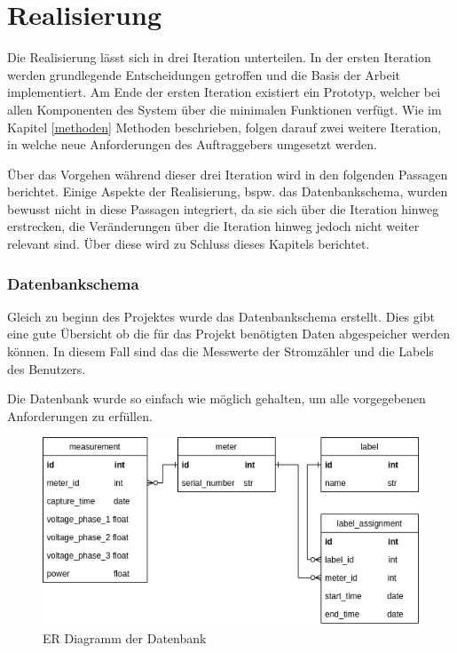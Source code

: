 \chapter{Realisierung}


Die Realisierung lässt sich in drei Iteration unterteilen.
In der ersten Iteration werden grundlegende Entscheidungen getroffen und die Basis der Arbeit implementiert.
Am Ende der ersten Iteration existiert ein Prototyp,
welcher bei allen Komponenten des System über die minimalen Funktionen verfügt.
Wie im Kapitel \ref{methoden} Methoden beschrieben, folgen darauf zwei weitere Iteration,
in welche neue Anforderungen des Auftraggebers umgesetzt werden.

Über das Vorgehen während dieser drei Iteration wird in den folgenden Passagen berichtet.
Einige Aspekte der Realisierung, bspw. das Datenbankschema,  wurden bewusst nicht in diese Passagen integriert,
da sie sich über die Iteration hinweg erstrecken,
die Veränderungen über die Iteration hinweg jedoch nicht weiter relevant sind.
Über diese wird zu Schluss dieses Kapitels berichtet.


\newpage

\newpage

\newpage

\subsection{Datenbankschema}
\label{rel:db}
Gleich zu beginn des Projektes wurde das Datenbankschema erstellt.
Dies gibt eine gute Übersicht ob die für das Projekt benötigten Daten
abgespeicher werden können. In diesem Fall sind das die Messwerte der Stromzähler
und die Labels des Benutzers.

Die Datenbank wurde so einfach wie möglich gehalten, um alle vorgegebenen
Anforderungen zu erfüllen.

\begin{figure}[H]
    \centering
    \includegraphics[width=1.0\textwidth]{gfx/smic-db}
    \caption{
        ER Diagramm der Datenbank
    }
    \label{fig:smic-db}
\end{figure}

